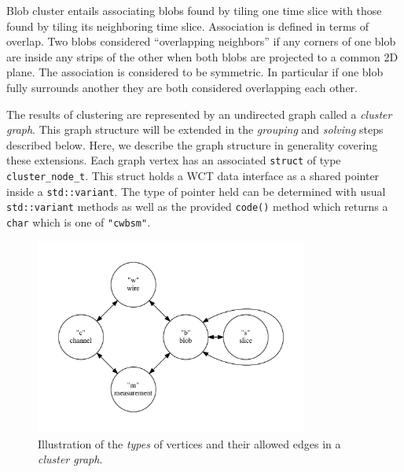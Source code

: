 \documentclass[11pt]{article}
\begin{document}
Blob cluster entails associating blobs found by tiling one time slice with those found by tiling its neighboring time slice. 
Association is defined in terms of overlap.
Two blobs considered ``overlapping neighbors'' if any corners of one blob are inside any strips of the other when both blobs are projected to a common 2D plane. 
The association is considered to be symmetric. 
In particular if one blob fully surrounds another they are both considered overlapping each other.

The results of clustering are represented by an undirected graph called a \textit{cluster graph}.
This graph structure will be extended in the \textit{grouping} and \textit{solving} steps described below.
Here, we describe the graph structure in generality covering these extensions.
Each graph vertex has an associated \texttt{struct} of type \texttt{cluster\_node\_t}.
This struct holds a WCT data interface as a shared pointer inside a \texttt{std::variant}.
The type of pointer held can be determined with usual \texttt{std::variant} methods as well as the provided \texttt{code()} method which returns a \texttt{char} which is one of \texttt{"cwbsm"}. 


\begin{figure}[htbp]
\centering
\includegraphics[width=0.8\textwidth]{figs/cluster-graph-types.pdf}
\caption{\label{fig:clustergraph}
Illustration of the \textit{types} of vertices and their allowed edges in a \textit{cluster graph}.}
\end{figure}
\end{document}

